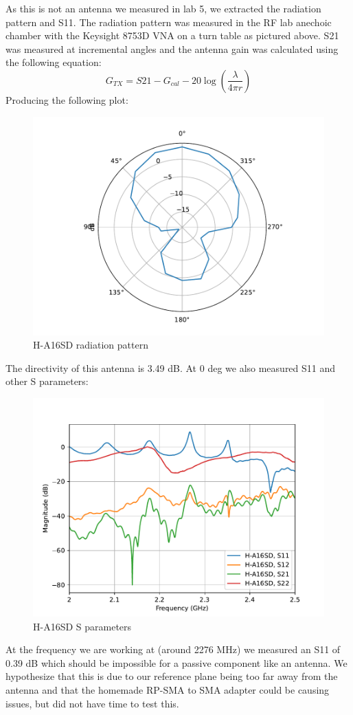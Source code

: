 \documentclass[letterpaper,12pt]{article}
\begin{document}
As this is not an antenna we measured in lab 5, we extracted the radiation pattern and S11. The radiation pattern was measured in the RF lab anechoic chamber with the Keysight 8753D VNA on a turn table as pictured above. S21 was measured at incremental angles and the antenna gain was calculated using the following equation:
$$
G_{TX}=S21-G_{cal}-20\log\left(\frac{\lambda}{4\pi r}\right)
$$
Producing the following plot:
\begin{figure}[H]
	\begin{centering}
		\includegraphics[width=0.5\columnwidth]{figures/antenna.radiation}
		\caption{H-A16SD radiation pattern}
	\end{centering}
\end{figure}
\noindent
The directivity of this antenna is 3.49 dB. At 0 deg we also measured S11 and other S parameters:
\begin{figure}[H]
	\begin{centering}
		\includegraphics[width=0.7\columnwidth]{figures/antenna.sparams}
		\caption{H-A16SD S parameters}
	\end{centering}
\end{figure}
\noindent
At the frequency we are working at (around 2276 MHz) we measured an S11 of 0.39 dB which should be impossible for a passive component like an antenna. We hypothesize that this is due to our reference plane being too far away from the antenna and that the homemade RP-SMA to SMA adapter could be causing issues, but did not have time to test this.
\end{document}
